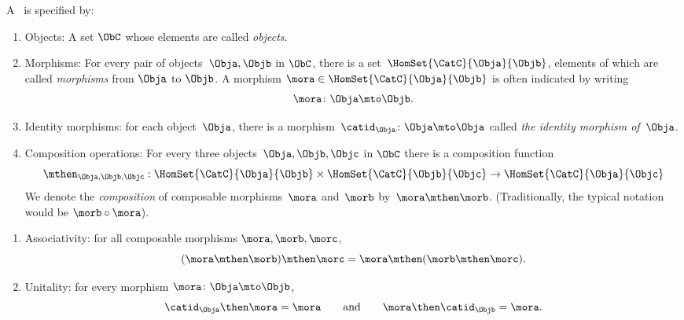 {\begin{forslides}
        \begin{ctdefinition}
            \label{def:category-var}
            A \emph{}~\CatC is specified by:
            \begin{body}
                \constit
                \begin{enumerate}
                    \item Objects: A set $\ObC$ whose elements are called \emph{objects}.
                    \item Morphisms: For every pair of objects~$\Obja,\Objb$ in $\ObC$, there is a set~$\HomSet{\CatC}{\Obja}{\Objb}$, elements of which are called \emph{morphisms} from $\Obja$ to $\Objb$.
                          A morphism $\mora \in \HomSet{\CatC}{\Obja}{\Objb}$ is often indicated by writing
                          \begin{equation*}
                              \mora \colon \Obja \mto \Objb.
                          \end{equation*}
                    \item Identity morphisms: for each object~$\Obja$, there is a morphism~$\catid_{\Obja}\colon \Obja \mto \Obja$  called \emph{the identity morphism of~$\Obja$}.
                    \item Composition operations: For every three objects~$\Obja,\Objb,\Objc$ in $\ObC$ there is a composition function
                          \begin{equation*}
                              \mthen_{\Obja,\Objb,\Objc}: \HomSet{\CatC}{\Obja}{\Objb} \times \HomSet{\CatC}{\Objb}{\Objc}\to \HomSet{\CatC}{\Obja}{\Objc}
                          \end{equation*}
                          We denote the \emph{composition} of composable morphisms~$\mora$ and~$\morb$ by~$\mora \mthen \morb$.
                          (Traditionally, the typical notation would be $\morb \circ \mora$).

                \end{enumerate}
                \condit
                \begin{enumerate}
                    \item Associativity: for all composable morphisms $\mora, \morb, \morc$,
                          \begin{equation}
                              (\mora\mthen \morb)
                              \mthen \morc= \mora \mthen (\morb \mthen \morc).
                          \end{equation}
                    \item Unitality: for every morphism $\mora \colon \Obja \mto \Objb$,
                          $$ \catid_{\Obja} \then \mora = \mora \quad \quad \text{and} \quad \quad \mora \then \catid_{\Objb} = \mora. $$
                \end{enumerate}
            \end{body}
        \end{ctdefinition}


\end{forslides}}
